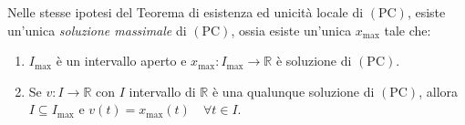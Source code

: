 \begin{thm}
Nelle stesse ipotesi del Teorema di esistenza ed unicità locale di $\mathrm{(PC)}$, esiste un'unica \emph{soluzione massimale} di $\mathrm{(PC)}$, ossia esiste un'unica $x_{\max}$ tale che:
\begin{enumerate}[labelindent=\parindent,leftmargin=*,label=\textnormal{(M$_\arabic*$)},start=1]
\item $I_{\max}$ è un intervallo aperto e $x_{\max} : I_{\max} \longrightarrow \mathbb{R}$ è soluzione di $\mathrm{(PC)}$.
\item Se $v : I \longrightarrow \mathbb{R}$ con $I$ intervallo di $\mathbb{R}$ è una qualunque soluzione di $\mathrm{(PC)}$, allora $I \subseteq I_{\max}$ e $v(t) = x_{\max}(t) \quad \forall t \in I$.
\end{enumerate}
\end{thm}

